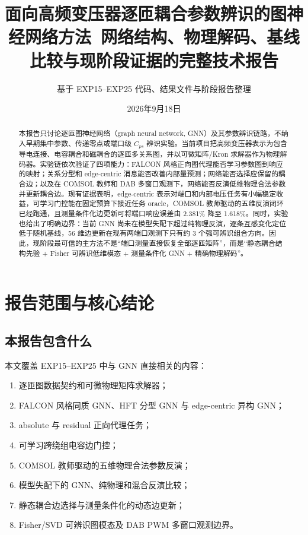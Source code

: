 \documentclass[UTF8,11pt,a4paper]{ctexart}
\title{\textbf{面向高频变压器逐匝耦合参数辨识的图神经网络方法}\
\large 网络结构、物理解码、基线比较与现阶段证据的完整技术报告}
\author{基于 EXP15--EXP25 代码、结果文件与阶段报告整理}
\date{2026年9月18日}
\begin{document}
\maketitle

\begin{abstract}
本报告只讨论逐匝图神经网络（graph neural network, GNN）及其参数辨识链路，不纳入早期集中参数、传递零点或端口级 $C_{ps}$ 辨识实验。当前项目把高频变压器表示为包含导电连接、电容耦合和磁耦合的逐匝多关系图，并以可微矩阵/Kron 求解器作为物理解码器。实验链依次验证了四项能力：FALCON 风格正向图代理能否学习参数图到响应的映射；关系分型和 edge-centric 消息能否改善内部量预测；网络能否选择应保留的耦合边；以及在 COMSOL 教师和 DAB 多窗口观测下，网络能否反演低维物理合法参数并更新耦合边。现有证据表明，edge-centric 表示对端口和内部电压任务有小幅稳定收益，可学习门控能在固定预算下接近任务 oracle，COMSOL 教师驱动的五维反演闭环已经跑通，且测量条件化边更新可将端口响应误差由 2.381\% 降至 1.618\%。同时，实验也给出了明确边界：当前 GNN 尚未在模型失配下超过纯物理反演，逐条互感变化定位低于随机基线，56 维边更新在现有两端口观测下只有约 3 个强可辨识组合方向。因此，现阶段最可信的主方法不是“端口测量直接恢复全部逐匝矩阵”，而是“静态耦合结构先验 + Fisher 可辨识低维模态 + 测量条件化 GNN + 精确物理解码”。
\end{abstract}

\tableofcontents
\newpage

\section{报告范围与核心结论}

\subsection{本报告包含什么}
本文覆盖 EXP15--EXP25 中与 GNN 直接相关的内容：
\begin{enumerate}
  \item 逐匝图数据契约和可微物理矩阵求解器；
  \item FALCON 风格同质 GNN、HFT 分型 GNN 与 edge-centric 异构 GNN；
  \item absolute 与 residual 正向代理任务；
  \item 可学习跨绕组电容边门控；
  \item COMSOL 教师驱动的五维物理合法参数反演；
  \item 模型失配下的 GNN、纯物理和混合反演比较；
  \item 静态耦合边选择与测量条件化的动态边更新；
  \item Fisher/SVD 可辨识图模态及 DAB PWM 多窗口观测边界。
\end{enumerate}
\end{document}
